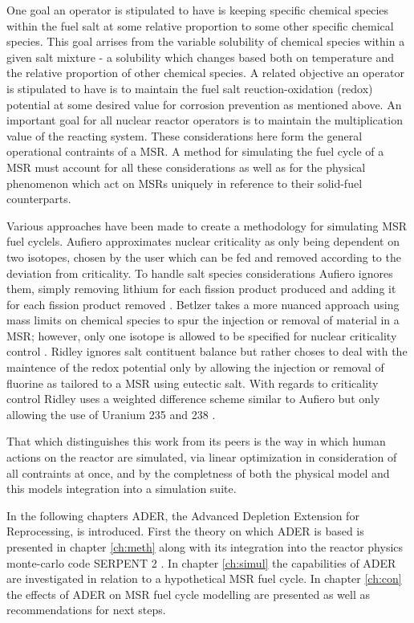 One goal an operator is stipulated to have is keeping specific chemical
species within the fuel salt at some relative proportion to some other
specific chemical species. This goal arrises from the variable solubility of
chemical species within a given salt mixture - a solubility which changes
based both on temperature and the relative proportion of other chemical species.
A related objective an operator is stipulated to have is to maintain the fuel
salt reuction-oxidation (redox) potential at some desired value for corrosion
prevention as mentioned above. An important goal for all nuclear reactor
operators is to maintain the multiplication value of the reacting system. These
considerations here form the general operational contraints of a MSR. A
method for simulating the fuel cycle of a MSR must account for all these
considerations as well as for the physical phenomenon which act on MSRs
uniquely in reference to their solid-fuel counterparts.

Various approaches have been made to create a methodology for simulating MSR
fuel cyclels. Aufiero approximates nuclear criticality as only being dependent 
on two isotopes, chosen by the user which can be fed and removed according to 
the deviation from criticality. To handle salt species considerations Aufiero
ignores them, simply removing lithium for each fission product produced and
adding it for each fission product removed \cite{Aufiero}. Betlzer takes a more
nuanced approach using mass limits on chemical species to spur the injection or
removal of material
in a MSR; however, only one isotope is allowed to be specified for nuclear
criticality control \cite{Betzler}. Ridley ignores salt contituent balance
but rather choses to deal with the maintence of the redox potential only by
allowing the injection or removal of fluorine as tailored to a MSR using
 eutectic salt. With regards to criticality control Ridley
uses a weighted difference scheme similar to Aufiero but only allowing the use
of Uranium 235 and 238 \cite{Ridley}. 

That which distinguishes this work from its peers is the way in which human 
actions on the reactor are simulated, via linear optimization in consideration
of all contraints at once, and by the completness of both the physical model
and this models integration into a simulation suite.

In the following chapters ADER, the Advanced Depletion Extension for
Reprocessing, is introduced. First the theory on which ADER is based is
presented in chapter \ref{ch:meth} along with its integration into the reactor
physics monte-carlo code SERPENT 2 \cite{Jaakko}. In chapter
\ref{ch:simul} the capabilities of ADER are investigated in relation to a
hypothetical MSR fuel cycle. In chapter \ref{ch:con} the effects of ADER on
MSR fuel cycle modelling are presented as well as recommendations for next
steps. 
